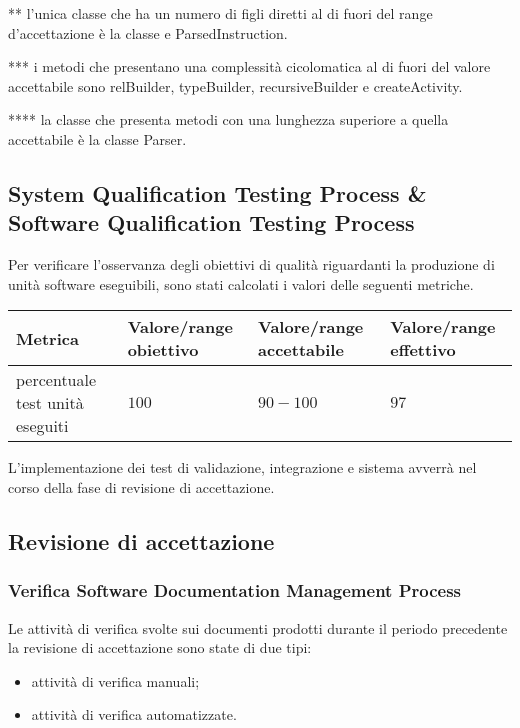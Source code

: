 	** l'unica classe che ha un numero di figli diretti al di fuori del range d'accettazione è la classe e ParsedInstruction.
	
	*** i metodi che presentano una complessità cicolomatica al di fuori del valore accettabile sono relBuilder, typeBuilder, recursiveBuilder e createActivity.
	
	**** la classe che presenta metodi con una lunghezza superiore a quella accettabile è la classe Parser.
	
	
	\subsection{System Qualification Testing Process \& Software Qualification Testing Process}
		Per verificare l'osservanza degli obiettivi di qualità riguardanti la produzione di unità software eseguibili, sono stati calcolati i valori delle seguenti metriche.
		
	\begin{center}
\begin{tabular}{| p{6cm} | p{2.5cm} | p{2.5cm} | p{2.5cm} |}
	\hline
	\textbf{Metrica} & \textbf{Valore/range obiettivo} & \textbf{Valore/range accettabile} & \textbf{Valore/range effettivo} \\
	\hline
	percentuale test unità eseguiti & $100$ & $90-100$ & $97$\\
	\hline
\end{tabular}
\end{center}
	
	L'implementazione dei test di validazione, integrazione e sistema avverrà nel corso della fase di revisione di accettazione.
	
	
\subsection{Revisione di accettazione}
		\subsubsection{Verifica Software Documentation Management Process}
		Le attività di verifica svolte sui documenti prodotti durante il periodo precedente la revisione di accettazione sono state di due tipi:
		\begin{itemize}		
			\item attività di verifica manuali;
			\item attività di verifica automatizzate.
		\end{itemize}
		

